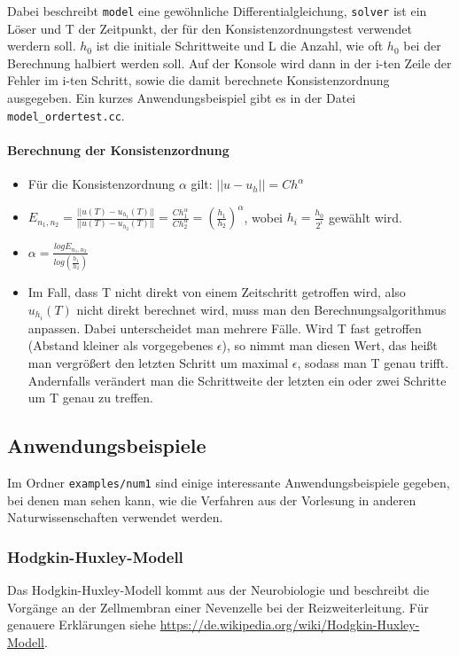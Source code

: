 \documentclass[a4paper,11pt]{article}
\theoremstyle{definition}
\begin{document}
Dabei beschreibt \lstinline{model} eine gewöhnliche
Differentialgleichung, \lstinline{solver} ist ein Löser und T der
Zeitpunkt, der für den Konsistenzordnungstest verwendet werdern
soll. $h_0$ ist die initiale Schrittweite und L die Anzahl, wie oft
$h_0$ bei der Berechnung halbiert werden soll.  Auf der Konsole wird
dann in der i-ten Zeile der Fehler im i-ten Schritt, sowie die damit
berechnete Konsistenzordnung ausgegeben.  Ein kurzes
Anwendungsbeispiel gibt es in der Datei
\lstinline{model_ordertest.cc}.

\paragraph{Berechnung der Konsistenzordnung}
\begin{itemize}
\item Für die Konsistenzordnung $\alpha$ gilt: $||u-u_h||=Ch^\alpha$
\item
  $E_{n_1,n_2}= \frac{||u(T)-u_{h_1}(T)||}{||u(T)-u_{h_2}(T)||} =
  \frac{Ch_1^\alpha}{Ch_2^\alpha}=
  \left(\frac{h_1}{h_2}\right)^\alpha$, wobei $h_i=\frac{h_0}{2^i}$
  gewählt wird.
\item
  $\alpha= \frac{log E_{n_1,n_2}}{log \left( \frac{h_1}{h_2} \right)}$
\item Im Fall, dass T nicht direkt von einem Zeitschritt getroffen
  wird, also $u_{h_i}(T)$ nicht direkt berechnet wird, muss man den
  Berechnungsalgorithmus anpassen. Dabei unterscheidet man mehrere
  Fälle. Wird T fast getroffen (Abstand kleiner als vorgegebenes
  $\epsilon$), so nimmt man diesen Wert, das heißt man vergrößert den
  letzten Schritt um maximal $\epsilon$, sodass man T genau
  trifft. Andernfalls verändert man die Schrittweite der letzten ein
  oder zwei Schritte um T genau zu treffen.
\end{itemize}



\subsection{Anwendungsbeispiele}
Im Ordner \lstinline{examples/num1} sind einige interessante Anwendungsbeispiele gegeben, bei denen man sehen kann, wie die Verfahren aus der Vorlesung in anderen Naturwissenschaften verwendet werden.

\subsubsection{Hodgkin-Huxley-Modell}
Das Hodgkin-Huxley-Modell kommt aus der Neurobiologie und beschreibt die Vorgänge an der Zellmembran einer Nevenzelle bei der Reizweiterleitung. Für genauere Erklärungen siehe \url{https://de.wikipedia.org/wiki/Hodgkin-Huxley-Modell}.
\end{document}
